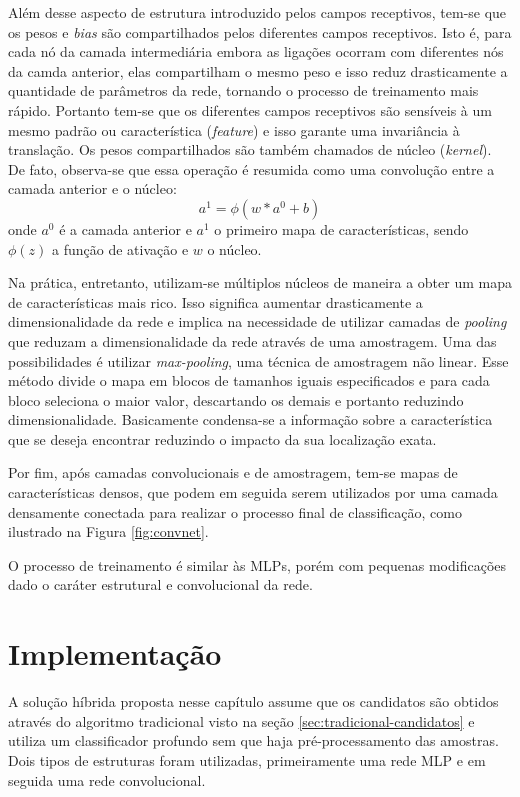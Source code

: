 Além desse aspecto de estrutura introduzido pelos campos receptivos, tem-se que os pesos e \textit{bias} são compartilhados pelos diferentes campos receptivos. Isto é, para cada nó da camada intermediária embora as ligações ocorram com diferentes nós da camda anterior, elas compartilham o mesmo peso e isso reduz drasticamente a quantidade de parâmetros da rede, tornando o processo de treinamento mais rápido. Portanto tem-se que os diferentes campos receptivos são sensíveis à um mesmo padrão ou característica (\textit{feature}) e isso garante uma invariância à translação. Os pesos compartilhados são também chamados de núcleo (\textit{kernel}). De fato, observa-se que essa operação é resumida como uma convolução entre a camada anterior e o núcleo:
\begin{equation}
a^1 = \phi(w \ast a^0 + b) 
\end{equation}
onde $a^0$ é a camada anterior e $a^1$ o primeiro mapa de características, sendo $\phi(z)$ a função de ativação e $w$ o núcleo.

Na prática, entretanto, utilizam-se múltiplos núcleos de maneira a obter um mapa de características mais rico. Isso significa aumentar drasticamente a dimensionalidade da rede e implica na necessidade de utilizar camadas de \textit{pooling} que reduzam a dimensionalidade da rede através de uma amostragem. Uma das possibilidades é utilizar \textit{max-pooling}, uma técnica de amostragem não linear. Esse método divide o mapa em blocos de tamanhos iguais especificados e para cada bloco seleciona o maior valor, descartando os demais e portanto reduzindo dimensionalidade. Basicamente condensa-se a informação sobre a característica que se deseja encontrar reduzindo o impacto da sua localização exata.

Por fim, após camadas convolucionais e de amostragem, tem-se mapas de características densos, que podem em seguida serem utilizados por uma camada densamente conectada para realizar o processo final de classificação, como ilustrado na Figura \ref{fig:convnet}. 

O processo de treinamento é similar às MLPs, porém com pequenas modificações dado o caráter estrutural e convolucional da rede.

\section{Implementação}
A solução híbrida proposta nesse capítulo assume que os candidatos são obtidos através do algoritmo tradicional visto na seção \ref{sec:tradicional-candidatos} e utiliza um classificador profundo sem que haja pré-processamento das amostras. Dois tipos de estruturas foram utilizadas, primeiramente uma rede MLP e em seguida uma rede convolucional. 

